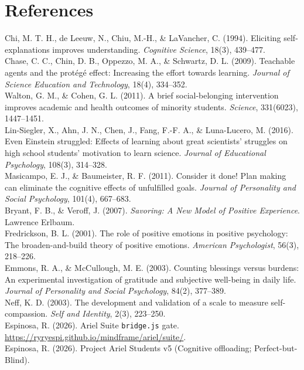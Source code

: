 \documentclass[11pt, a4paper]{article}
\begin{document}
\section*{References}
\noindent [1] Chi, M. T. H., de Leeuw, N., Chiu, M.-H., \& LaVancher, C. (1994). Eliciting self-explanations improves understanding. \textit{Cognitive Science}, 18(3), 439--477.\\
\noindent [2] Chase, C. C., Chin, D. B., Oppezzo, M. A., \& Schwartz, D. L. (2009). Teachable agents and the prot\'{e}g\'{e} effect: Increasing the effort towards learning. \textit{Journal of Science Education and Technology}, 18(4), 334--352.\\
\noindent [3] Walton, G. M., \& Cohen, G. L. (2011). A brief social-belonging intervention improves academic and health outcomes of minority students. \textit{Science}, 331(6023), 1447--1451.\\
\noindent [4] Lin-Siegler, X., Ahn, J. N., Chen, J., Fang, F.-F. A., \& Luna-Lucero, M. (2016). Even Einstein struggled: Effects of learning about great scientists' struggles on high school students' motivation to learn science. \textit{Journal of Educational Psychology}, 108(3), 314--328.\\
\noindent [5] Masicampo, E. J., \& Baumeister, R. F. (2011). Consider it done! Plan making can eliminate the cognitive effects of unfulfilled goals. \textit{Journal of Personality and Social Psychology}, 101(4), 667--683.\\
\noindent [6] Bryant, F. B., \& Veroff, J. (2007). \textit{Savoring: A New Model of Positive Experience}. Lawrence Erlbaum.\\
\noindent [7] Fredrickson, B. L. (2001). The role of positive emotions in positive psychology: The broaden-and-build theory of positive emotions. \textit{American Psychologist}, 56(3), 218--226.\\
\noindent [8] Emmons, R. A., \& McCullough, M. E. (2003). Counting blessings versus burdens: An experimental investigation of gratitude and subjective well-being in daily life. \textit{Journal of Personality and Social Psychology}, 84(2), 377--389.\\
\noindent [9] Neff, K. D. (2003). The development and validation of a scale to measure self-compassion. \textit{Self and Identity}, 2(3), 223--250.\\
\noindent [10] Espinosa, R. (2026). Ariel Suite \texttt{bridge.js} gate. \url{https://ryryespi.github.io/mindframe/ariel/suite/}.\\
\noindent [11] Espinosa, R. (2026). Project Ariel Students v5 (Cognitive offloading; Perfect-but-Blind).\\
\end{document}
